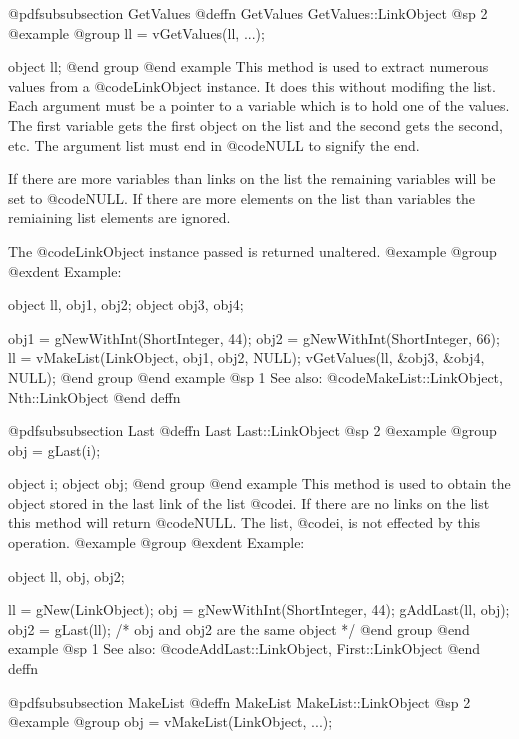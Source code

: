@pdfsubsubsection {GetValues}
@deffn {GetValues} GetValues::LinkObject
@sp 2
@example
@group
ll = vGetValues(ll, ...);

object  ll;
@end group
@end example
This method is used to extract numerous values from a @code{LinkObject} instance.
It does this without modifing the list.  Each argument must be a pointer to a
variable which is to hold one of the values.  The first variable gets the first
object on the list and the second gets the second, etc.  The argument list must
end in @code{NULL} to signify the end.

If there are more variables than links on the list the remaining variables will be
set to @code{NULL}.  If there are more elements on the list than variables the
remiaining list elements are ignored.

The @code{LinkObject} instance passed is returned unaltered.
@example
@group
@exdent Example:

object  ll, obj1, obj2;
object  obj3, obj4;

obj1 = gNewWithInt(ShortInteger, 44);
obj2 = gNewWithInt(ShortInteger, 66);
ll = vMakeList(LinkObject, obj1, obj2, NULL);
vGetValues(ll, &obj3, &obj4, NULL);
@end group
@end example
@sp 1
See also:  @code{MakeList::LinkObject, Nth::LinkObject}
@end deffn











@pdfsubsubsection {Last}
@deffn {Last} Last::LinkObject
@sp 2
@example
@group
obj = gLast(i);

object  i;
object  obj;
@end group
@end example
This method is used to obtain the object stored in the last link of the
list @code{i}.  If there are no links on the list this method will
return @code{NULL}.  The list, @code{i}, is not effected by this operation.
@example
@group
@exdent Example:

object  ll, obj, obj2;

ll = gNew(LinkObject);
obj = gNewWithInt(ShortInteger, 44);
gAddLast(ll, obj);
obj2 = gLast(ll);
/* obj and obj2 are the same object  */
@end group
@end example
@sp 1
See also:  @code{AddLast::LinkObject, First::LinkObject}
@end deffn











@pdfsubsubsection {MakeList}
@deffn {MakeList} MakeList::LinkObject
@sp 2
@example
@group
obj = vMakeList(LinkObject, ...);

